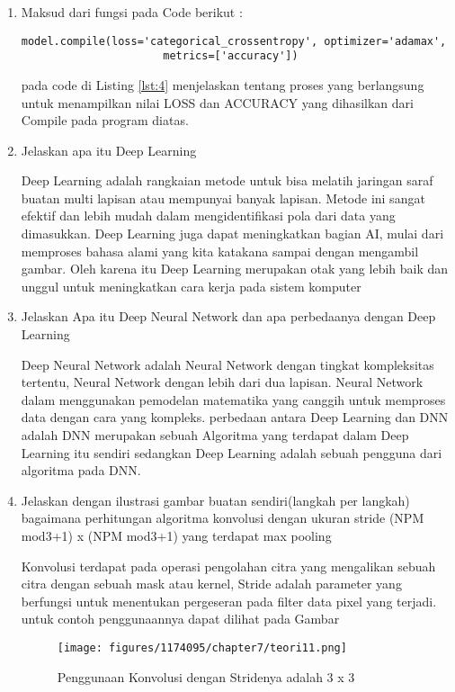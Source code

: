 \begin{enumerate}
\item Maksud dari fungsi pada Code berikut :
\begin{lstlisting}[caption=Compile model,label={lst:4}]
	model.compile(loss='categorical_crossentropy', optimizer='adamax',
	                  metrics=['accuracy'])
\end{lstlisting}
\par pada code di Listing \ref{lst:4} menjelaskan tentang proses yang berlangsung untuk menampilkan nilai LOSS dan ACCURACY yang dihasilkan dari Compile pada program diatas.

\item Jelaskan apa itu Deep Learning
\par Deep Learning adalah rangkaian metode untuk bisa melatih jaringan saraf buatan multi lapisan atau mempunyai banyak lapisan. Metode ini sangat efektif dan lebih mudah dalam mengidentifikasi pola dari data yang dimasukkan. Deep Learning juga dapat meningkatkan bagian AI, mulai dari memproses bahasa alami yang kita katakana sampai dengan mengambil gambar. Oleh karena itu Deep Learning merupakan otak yang lebih baik dan unggul untuk meningkatkan cara kerja pada sistem komputer

\item Jelaskan Apa itu Deep Neural Network dan apa perbedaanya dengan Deep Learning
\par Deep Neural Network adalah Neural Network dengan tingkat kompleksitas tertentu, Neural Network dengan lebih dari dua lapisan.  Neural Network dalam menggunakan pemodelan matematika yang canggih untuk memproses data dengan cara yang kompleks. perbedaan antara Deep Learning dan DNN adalah DNN merupakan sebuah Algoritma yang terdapat dalam Deep Learning itu sendiri sedangkan Deep Learning adalah sebuah pengguna dari algoritma pada DNN.

\item Jelaskan dengan ilustrasi gambar buatan sendiri(langkah per langkah) bagaimana perhitungan algoritma konvolusi dengan ukuran stride (NPM mod3+1) x (NPM mod3+1) yang terdapat max pooling

\par Konvolusi terdapat pada operasi pengolahan citra yang mengalikan sebuah citra dengan sebuah mask atau kernel, Stride adalah parameter yang berfungsi untuk menentukan pergeseran pada filter data pixel yang terjadi. untuk contoh penggunaannya dapat dilihat pada Gambar

\begin{figure}[H]
    \texttt{[image: figures/1174095/chapter7/teori11.png]}
    \centering
      \caption{Penggunaan Konvolusi dengan Stridenya adalah 3 x 3}
\end{figure}

\end{enumerate}


